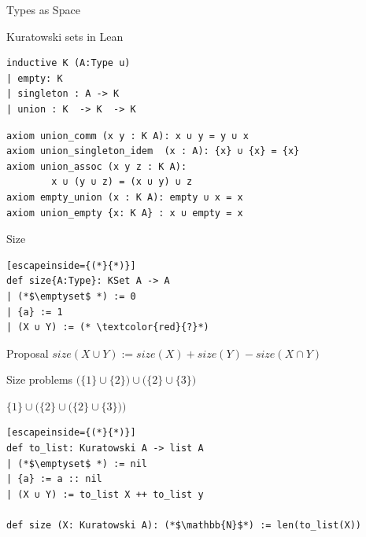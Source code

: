 \documentclass{beamer}
\begin{document}
\begin{frame}{Types as Space}
\end{frame}
\begin{frame}[fragile]{Kuratowski sets in Lean}
    \begin{lstlisting}
inductive K (A:Type u) 
| empty: K 
| singleton : A -> K 
| union : K  -> K  -> K
    \end{lstlisting}
    \pause 
    \begin{lstlisting}
axiom union_comm (x y : K A): x ∪ y = y ∪ x
axiom union_singleton_idem  (x : A): {x} ∪ {x} = {x}
axiom union_assoc (x y z : K A): 
        x ∪ (y ∪ z) = (x ∪ y) ∪ z
axiom empty_union (x : K A): empty ∪ x = x
axiom union_empty {x: K A} : x ∪ empty = x
    \end{lstlisting}
    
\end{frame}

\begin{frame}[fragile]{Size}
    \begin{lstlisting}[escapeinside={(*}{*)}]        
def size{A:Type}: KSet A -> A
| (*$\emptyset$ *) := 0
| {a} := 1
| (X ∪ Y) := (* \textcolor{red}{?}*)
    \end{lstlisting}
\pause
    \begin{block}{Proposal}
        $size(X \cup Y) := size(X) + size (Y) - size(X \cap Y)$
    \end{block}
\end{frame}

\begin{frame}[fragile]{Size problems}
    $\bigl( \{1\} \cup \{2\} \bigr) \cup \bigl( \{2\} \cup \{3\} \bigr) $



    $ \{1\} \cup \bigl( \{2\} \cup \bigl( \{2\} \cup \{3\} \bigr) \bigr) $
\pause
\begin{lstlisting}[escapeinside={(*}{*)}]
def to_list: Kuratowski A -> list A
| (*$\emptyset$ *) := nil
| {a} := a :: nil
| (X ∪ Y) := to_list X ++ to_list y

def size (X: Kuratowski A): (*$\mathbb{N}$*) := len(to_list(X))
\end{lstlisting}
\end{frame}
    
\end{document}
